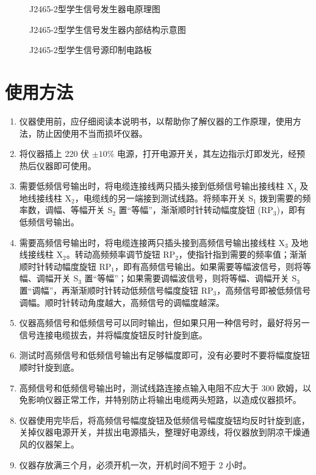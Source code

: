 \documentclass[12pt,UTF8]{ctexbook}
\begin{document}
	\begin{figure}[H]
		\centering
		\caption{J2465-2型学生信号发生器电原理图}
		\label{fig:schematic}
	\end{figure}
	
	\begin{figure}[H]
		\centering
		\caption{J2465-2型学生信号发生器内部结构示意图}
		\label{fig:structure}
	\end{figure}
	
	\begin{figure}[H]
		\centering
		\caption{J2465-2型学生信号源印制电路板}
		\label{fig:pcb}
	\end{figure}
	
	\section{使用方法}
	\begin{enumerate}
		\item 仪器使用前，应仔细阅读本说明书，以帮助你了解仪器的工作原理，使用方法，防止因使用不当而损坏仪器。
		\item 将仪器插上 220 伏 \(\pm 10\%\) 电源，打开电源开关，其左边指示灯即发光，经预热后仪器即可使用。
		\item 需要低频信号输出时，将电缆连接线两只插头接到低频信号输出接线柱 X\(_4\) 及地线接线柱 X\(_2\)，电缆线的另一端接到测试线路。将频率开关 S\(_1\) 拨到需要的频率数，调幅、等幅开关 S\(_2\) 置“等幅”，渐渐顺时针转动幅度旋钮 (RP\(_3\))，即有低频信号输出。
		\item 需要高频信号输出时，将电缆连接两只插头接到高频信号输出接线柱 X\(_3\) 及地线接线柱 X\(_2\)。转动高频频率调节旋钮 RP\(_2\)，使指针指到需要的频率值；渐渐顺时针转动幅度旋钮 RP\(_1\)，即有高频信号输出。如果需要等幅波信号，则将等幅、调幅开关 S\(_3\) 置“等幅”；如果需要调幅波信号，则将等幅、调幅开关 S\(_3\) 置“调幅”，再渐渐顺时针转动低频信号幅度旋钮 RP\(_3\)，高频信号即被低频信号调幅。顺时针转动角度越大，高频信号的调幅度越深。
		\item 仪器高频信号和低频信号可以同时输出，但如果只用一种信号时，最好将另一信号连接电缆拔去，并将幅度旋钮反时针旋到底。
		\item 测试时高频信号和低频信号输出有足够幅度即可，没有必要时不要将幅度旋钮顺时针旋到底。
		\item 高频信号和低频信号输出时，测试线路连接点输入电阻不应大于 300 欧姆，以免影响仪器正常工作，并特别防止将输出电缆两头短路，以造成仪器损坏。
		\item 仪器使用完毕后，将高频信号幅度旋钮及低频信号幅度旋钮均反时针旋到底，关掉仪器电源开关，并拔出电源插头，整理好电源线，将仪器放到阴凉干燥通风的仪器架上。
		\item 仪器存放满三个月，必须开机一次，开机时间不短于 2 小时。
	\end{enumerate}
	
\end{document}
